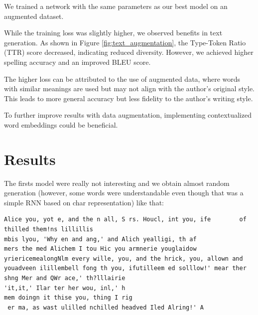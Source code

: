 \documentclass{article}
\begin{document}

We trained a network with the same parameters as our best model on an augmented dataset.

While the training loss was slightly higher, we observed benefits in text generation. As shown in Figure \ref{fig:text_augmentation}, the Type-Token Ratio (TTR) score decreased, indicating reduced diversity. However, we achieved higher spelling accuracy and an improved BLEU score.

The higher loss can be attributed to the use of augmented data, where words with similar meanings are used but may not align with the author's original style. This leads to more general accuracy but less fidelity to the author's writing style.

To further improve results with data augmentation, implementing contextualized word embeddings could be beneficial.\cite{wordrep}



\section{Results}

The firsts model were really not interesting and we obtain almost random generation (however, some words were understandable even though that was a simple RNN based on char representation) like that:
\begin{lstlisting}[breaklines]
Alice you, yot e, and the n all, S rs. Houcl, int you, ife        of thilled them!ns lillillis
mbis lyou, 'Why en and ang,' and Alich yealligi, th af
mers the med Alichem I tou Hic you armnerie youglaidow yriericemealongNlm every wille, you, and the hrick, you, allown and youadveen ilillembell fong th you, ifutilleem ed solllow!' mear ther shng Mer and QWr ace,' th?lllairie
'it,it,' Ilar ter her wou, inl,' h
mem doingn it thise you, thing I rig
 er ma, as wast ulilled nchilled headved Iled Alring!' A
\end{lstlisting}
\end{document}
